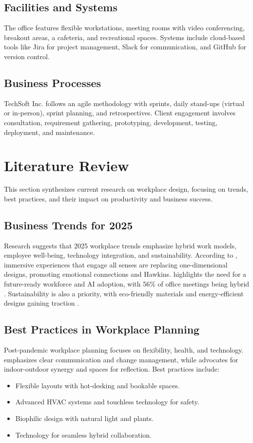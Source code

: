 \documentclass[12pt]{article}
\begin{document}
\subsection{Facilities and Systems}
The office features flexible workstations, meeting rooms with video conferencing, breakout areas, a cafeteria, and recreational spaces. Systems include cloud-based tools like Jira for project management, Slack for communication, and GitHub for version control.

\subsection{Business Processes}
TechSoft Inc. follows an agile methodology with sprints, daily stand-ups (virtual or in-person), sprint planning, and retrospectives. Client engagement involves consultation, requirement gathering, prototyping, development, testing, deployment, and maintenance.

\section{Literature Review}
This section synthesizes current research on workplace design, focusing on trends, best practices, and their impact on productivity and business success.

\subsection{Business Trends for 2025}
Research suggests that 2025 workplace trends emphasize hybrid work models, employee well-being, technology integration, and sustainability. According to \citet{gensler2025}, immersive experiences that engage all senses are replacing one-dimensional designs, promoting emotional connections and Hawkins{}. \citet{hbr2025} highlights the need for a future-ready workforce and AI adoption, with 56\% of office meetings being hybrid \citep{gensler2024}. Sustainability is also a priority, with eco-friendly materials and energy-efficient designs gaining traction \citep{edge2025}.

\subsection{Best Practices in Workplace Planning}
Post-pandemic workplace planning focuses on flexibility, health, and technology. \citet{gallup2025} emphasizes clear communication and change management, while \citet{gensler2023} advocates for indoor-outdoor synergy and spaces for reflection. Best practices include:
\begin{itemize}
    \item Flexible layouts with hot-desking and bookable spaces.
    \item Advanced HVAC systems and touchless technology for safety.
    \item Biophilic design with natural light and plants.
    \item Technology for seamless hybrid collaboration.
\end{itemize}
\end{document}
